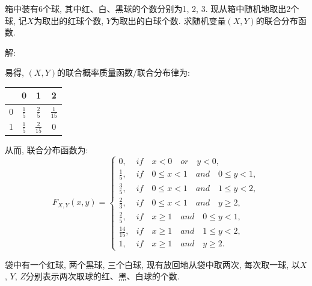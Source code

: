 \documentclass[standard]{ExBook}
\renewenvironment{shaded}{%
  \def\FrameCommand{\fboxsep=\FrameSep \colorbox{shadecolor}}%
  \MakeFramed{\advance\hsize-\width \FrameRestore}%
}{%
  \endMakeFramed
}
\begin{document}
\begin{qitems}
    \begin{bbox}
    \begin{shaded}
        \qitem 
箱中装有6个球, 其中红、白、黑球的个数分别为1, 2, 3. 现从箱中随机地取出2个球, 记$X$为取出的红球个数, $Y$为取出的白球个数. 求随机变量$(X,Y)$的联合分布函数.
    \end{shaded}
    \end{bbox}

\vspace{\dimexpr2.5cm-5em\relax}

解: 

易得, $(X,Y)$的联合概率质量函数/联合分布律为:
\begin{footnotesize}
\begin{center}
    \renewcommand{\arraystretch}{1.7}
    \setlength{\tabcolsep}{25pt}
    \begin{tabular}{c|c|c|c}
	    \hline
	    \diagbox{$X$}{$P(X,Y)$}{$Y$} & 0 & 1 & 2 \\
	    \hline
	    0 & $\displaystyle\frac{1}{5}$ & $\displaystyle\frac{2}{5}$ & $\displaystyle\frac{1}{15}$\\
	    \hline
	    1 & $\displaystyle\frac{1}{5}$ & $\displaystyle\frac{2}{15}$ & 0\\
	    \hline
    \end{tabular}
\end{center}
\end{footnotesize}
从而, 联合分布函数为:
\[
F_{X,Y}(x, y) = 
\begin{cases} 
0, & if\quad x < 0\quad or\quad y < 0, \\ 
\frac{1}{5}, & if\quad 0 \leq x < 1\quad and\quad 0 \leq y < 1, \\ 
\frac{3}{5}, & if\quad 0 \leq x < 1\quad and\quad 1 \leq y < 2, \\ 
\frac{2}{3}, & if\quad 0 \leq x < 1\quad and\quad y \geq 2, \\ 
\frac{2}{5}, & if\quad x \geq 1\quad and\quad 0 \leq y < 1, \\ 
\frac{14}{15}, & if\quad x \geq 1\quad and\quad 1 \leq y < 2, \\ 
1, & if\quad x \geq 1\quad and\quad y \geq 2. 
\end{cases}
\]

\vspace{2.5cm-5em}

    \begin{bbox}
    \begin{shaded}
        \qitem
袋中有一个红球, 两个黑球, 三个白球, 现有放回地从袋中取两次, 每次取一球, 以$X$, $Y$, $Z$分别表示两次取球的红、黑、白球的个数.


\end{shaded}
\end{bbox}
\end{qitems}
\end{document}
